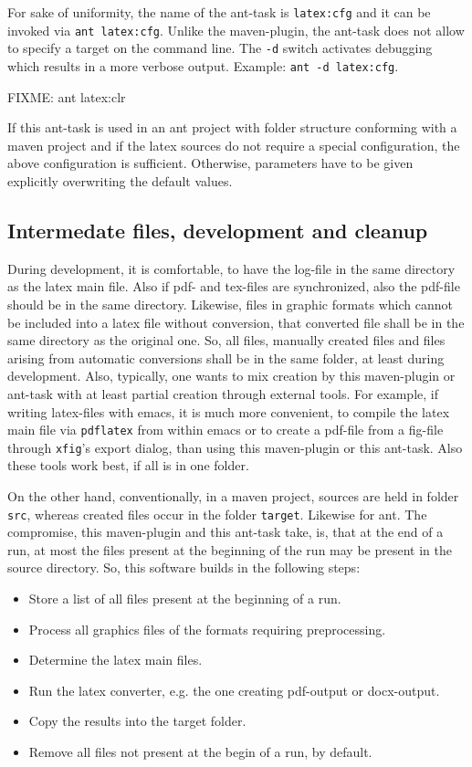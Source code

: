 \documentclass[12pt]{article}
\begin{document}
For sake of uniformity, 
the name of the ant-task is {\tt latex:cfg} 
and it can be invoked via {\tt ant latex:cfg}. 
Unlike the maven-plugin, the ant-task 
does not allow to specify a target on the command line. 
The {\tt -d} switch activates debugging 
which results in a more verbose output. 
Example: {\tt ant -d latex:cfg}. 

FIXME: ant latex:clr 

If this ant-task is used in an ant project 
with folder structure conforming with a maven project 
and if the latex sources do not require a special configuration, 
the above configuration is sufficient. 
Otherwise, parameters have to be given explicitly 
overwriting the default values. 

\subsection{Intermedate files, development and cleanup}\label{subsec:devel}

During development, it is comfortable, 
to have the log-file in the same directory as the latex main file. 
Also if pdf- and tex-files are synchronized, 
also the pdf-file should be in the same directory. 
Likewise, files in graphic formats 
which cannot be included into a latex file without conversion, 
that converted file shall be in the same directory as the original one. 
So, all files, manually created files 
and files arising from automatic conversions 
shall be in the same folder, at least during development. 
Also, typically, one wants to mix creation by this maven-plugin or ant-task 
with at least partial creation through external tools. 
For example, if writing latex-files with emacs, 
it is much more convenient, to compile the latex main file 
via {\tt pdflatex} from within emacs 
or to create a pdf-file from a \gls{fig}-file 
through {\tt xfig}'s export dialog, 
than using this maven-plugin or this ant-task. 
Also these tools work best, if all is in one folder. 

On the other hand, 
conventionally, in a maven project, 
sources are held in folder {\tt src}, 
whereas created files occur in the folder {\tt target}. 
Likewise for ant. 
The compromise, this maven-plugin and this ant-task take, 
is, that at the end of a run, 
at most the files present at the beginning of the run 
may be present in the source directory. 
So, this software builds in the following steps: 
%
\begin{itemize}
\item
Store a list of all files present at the beginning of a run.
\item
Process all graphics files of the formats requiring preprocessing.
\item
Determine the latex main files.
\item
Run the latex converter, e.g. the one creating pdf-output or docx-output.
\item
Copy the results into the target folder.
\item
Remove all files not present at the begin of a run, by default. 
\end{itemize}
\end{document}
